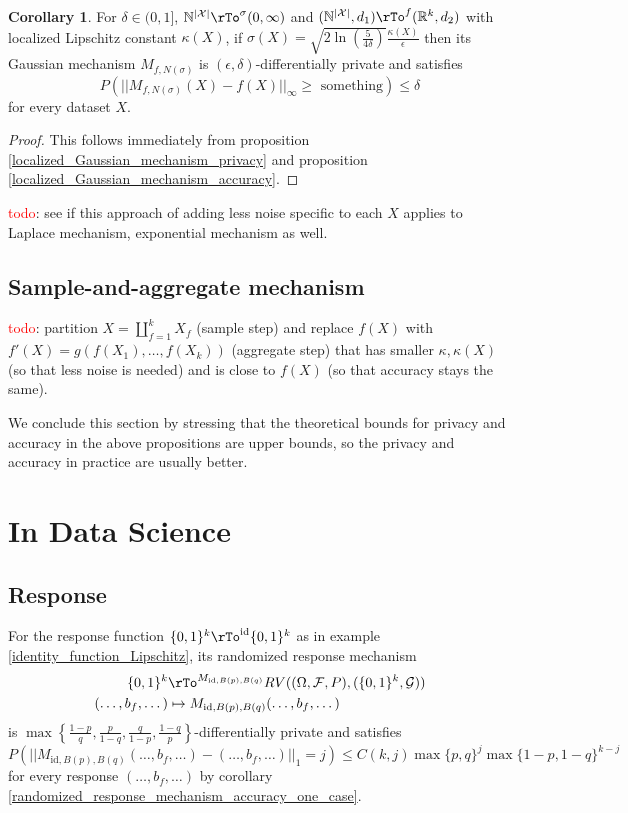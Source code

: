 \documentclass[12pt]{amsart}
\theoremstyle{definition}
\newtheorem{corollary}[theorem]{Corollary}
\begin{document}
\begin{corollary} \label{localized_Gaussian_mechanism_accuracy_one_case} For $\delta \in (0, 1]$, $\mathbb{N}^{|\mathcal{X}|} \rTo^{\sigma} (0, \infty)$ and $(\mathbb{N}^{|\mathcal{X}|}, d_1) \rTo^f (\mathbb{R}^k, d_2)$ with localized Lipschitz constant $\kappa(X)$, if $\sigma(X) = \sqrt{2 \ln(\frac{5}{4 \delta})} \frac{\kappa(X)}{\epsilon}$ then its Gaussian mechanism $M_{f, N(\sigma)}$ is $(\epsilon, \delta)$-differentially private and satisfies
$$P(||M_{f, N(\sigma)}(X) - f(X)||_{\infty} \geq \text{ something}) \leq \delta$$
for every dataset $X$.
\end{corollary}
\begin{proof} This follows immediately from proposition \ref{localized_Gaussian_mechanism_privacy} and proposition \ref{localized_Gaussian_mechanism_accuracy}.
\end{proof}

\textcolor{red}{todo}: see if this approach of adding less noise specific to each $X$ applies to Laplace mechanism, exponential mechanism as well.

\subsection{Sample-and-aggregate mechanism} \label{sample_and_aggregate_mechanism} \textcolor{red}{todo}: partition $X = \coprod\limits_{f = 1}^k X_f$ (sample step) and replace $f(X)$ with $f'(X) = g(f(X_1), \dots , f(X_k))$ (aggregate step) that has smaller $\kappa, \kappa(X)$ (so that less noise is needed) and is close to $f(X)$ (so that accuracy stays the same).

We conclude this section by stressing that the theoretical bounds for privacy and accuracy in the above propositions are upper bounds, so the privacy and accuracy in practice are usually better.

\section{In Data Science} \label{in_data_science}

\subsection{Response} \label{data_science_response} For the response function $\{0, 1\}^k \rTo^{\text{id}} \{0, 1\}^k$ as in example \ref{identity_function_Lipschitz}, its randomized response mechanism
\begin{align*}
\{0, 1\}^k & \rTo^{M_{\text{id}, B(p), B(q)}} RV((\Omega, \mathcal{F}, P), (\{0, 1\}^k, \mathcal{G})) \\
(\dots , b_f, \dots) & \mapsto M_{\text{id}, B(p), B(q)}(\dots , b_f, \dots) \\
\end{align*}
is $\max \left\{ \frac{1 - p}{q}, \frac{p}{1 - q}, \frac{q}{1 - p}, \frac{1 - q}{p} \right\}$-differentially private and satisfies
$$P(||M_{\text{id}, B(p), B(q)}(\dots , b_f, \dots) - (\dots , b_f, \dots)||_1 = j) \leq C(k, j) \max\{p, q\}^j \max\{1 - p, 1 - q\}^{k - j}$$
for every response $(\dots , b_f, \dots)$ by corollary \ref{randomized_response_mechanism_accuracy_one_case}.
\end{document}
